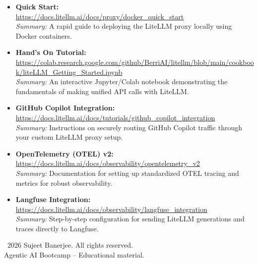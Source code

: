 \documentclass[12pt,a4paper]{article}
\begin{document}
\begin{itemize}
    \item \textbf{Quick Start:}\\
    \url{https://docs.litellm.ai/docs/proxy/docker_quick_start}\\
    \textit{Summary:} A rapid guide to deploying the LiteLLM proxy locally using Docker containers.
    
    \item \textbf{Hand's On Tutorial:}\\
    \url{https://colab.research.google.com/github/BerriAI/litellm/blob/main/cookbook/liteLLM_Getting_Started.ipynb}\\
    \textit{Summary:} An interactive Jupyter/Colab notebook demonstrating the fundamentals of making unified API calls with LiteLLM.
    
    \item \textbf{GitHub Copilot Integration:}\\
    \url{https://docs.litellm.ai/docs/tutorials/github_copilot_integration}\\
    \textit{Summary:} Instructions on securely routing GitHub Copilot traffic through your custom LiteLLM proxy setup.
    
    \item \textbf{OpenTelemetry (OTEL) v2:}\\
    \url{https://docs.litellm.ai/docs/observability/opentelemetry_v2}\\
    \textit{Summary:} Documentation for setting up standardized OTEL tracing and metrics for robust observability.
    
    \item \textbf{Langfuse Integration:}\\
    \url{https://docs.litellm.ai/docs/observability/langfuse_integration}\\
    \textit{Summary:} Step-by-step configuration for sending LiteLLM generations and traces directly to Langfuse.
\end{itemize}

\vfill
\begin{center}\small
\textcopyright\ 2026 Sujeet Banerjee. All rights reserved.\\
Agentic AI Bootcamp -- Educational material.
\end{center}
\end{document}
